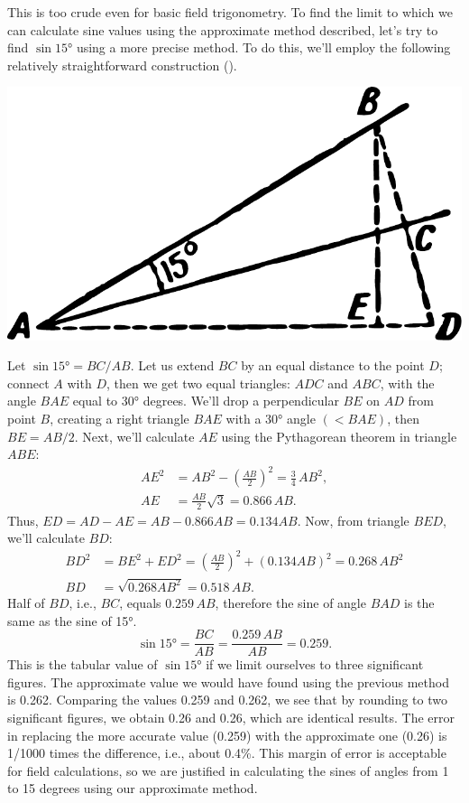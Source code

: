 This is too crude even for basic field trigonometry. To find the limit to which we can calculate sine values using the approximate method described, let's try to find $\sin \ang{15}$ using a more precise method. To do this, we'll employ the following relatively straightforward construction ().

\begin{marginfigure}%
\centering
\includegraphics[width=\textwidth]{figures/ch-05/fig-089.pdf}
\end{marginfigure}

Let $\sin \ang{15} = BC/AB$. Let us extend $BC$ by an equal distance to the point $D$; connect $A$ with $D$, then we get two equal triangles: $ADC$ and $ABC$, with the angle $BAE$ equal to \ang{30} degrees. We'll drop a perpendicular $BE$ on $AD$ from point $B$, creating a right triangle $BAE$ with a \ang{30} angle $(< BAE)$, then $BE = AB/2$. Next, we'll calculate $AE$ using the Pythagorean theorem in triangle $ABE$:
\begin{align*}%
AE^{2} & = AB^{2} - \left(\frac{AB}{2} \right)^{2}= \frac{3}{4}\, AB^{2},\\
AE & = \frac{AB}{2} \sqrt{3} = 0.866 \, AB.
\end{align*}
Thus, $ED = AD - AE = AB - 0.866 AB = 0.134 AB$. Now, from triangle $BED$, we'll calculate $BD$:
\begin{align*}%
BD^{2} & = BE^{2} + ED^{2} = \left(\frac{AB}{2} \right)^{2} + (0.134AB)^{2} = 0.268\, AB^{2}\\
BD & = \sqrt{0.268AB^{2}} = 0.518 \, AB.
\end{align*}
Half of $BD$, i.e., $BC$, equals $0.259\, AB$, therefore the sine of angle $BAD$ is the same as the sine of \ang{15}.
\begin{equation*}%
\sin \ang{15} = \frac{BC}{AB} = \frac{0.259 \,AB}{AB} = 0.259.
\end{equation*}
This is the tabular value of $\sin \ang{15}$ if we limit ourselves to three significant figures. The approximate value we would have found using the previous method is 0.262. Comparing the values 0.259 and 0.262, we see that by rounding to two significant figures, we obtain 0.26 and 0.26, which are identical results. The error in replacing the more accurate value (0.259) with the approximate one (0.26) is 1/1000 times the difference, i.e., about 0.4\%. This margin of error is acceptable for field calculations, so we are justified in calculating the sines of angles from 1 to 15 degrees using our approximate method.

